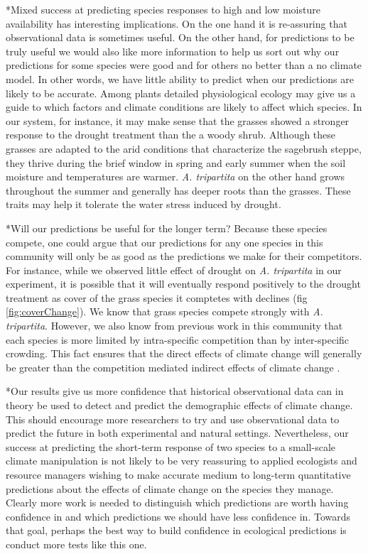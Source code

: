 \documentclass[11pt]{article}
\begin{document}
\begin{doublespacing}
*Mixed success at predicting species responses to high and low moisture availability has interesting implications.  On the one hand it is re-assuring that observational data is sometimes useful. On the other hand, for predictions to be truly useful we would also like more information to help us sort out why our predictions for some species were good and for others no better than a no climate model.  In other words, we have little ability to predict when our predictions are likely to be accurate.  Among plants detailed physiological ecology may give us a guide to which factors and climate conditions are likely to affect which species.  In our system, for instance, it may make sense that the grasses showed a stronger response to the drought treatment than the a woody shrub.  Although these grasses are adapted to the arid conditions that characterize the sagebrush steppe, they thrive during the brief window in spring and early summer when the soil moisture and temperatures are warmer.  \textit{A. tripartita} on the other hand grows throughout the summer and generally has deeper roots than the grasses. These traits may help it tolerate the water stress induced by drought. 

*Will our predictions be useful for the longer term? Because these species compete, one could argue that our predictions for any one species in this community will only be as good as the predictions we make for their competitors. For instance, while we observed little effect of drought on \textit{A. tripartita} in our experiment, it is possible that it will eventually respond positively to the drought treatment as cover of the grass species it comptetes with declines (fig \ref{fig:coverChange}). We know that grass species compete strongly with \textit{A. tripartita}.  However, we also know from previous work in this community that each species is more limited by intra-specific competition than by inter-specific crowding.  This fact ensures that the direct effects of climate change will generally be greater than the competition mediated indirect effects of climate change \cite{chu_direct_2016, kleinhesselink_indirect_2015}.  

*Our results give us more confidence that historical observational data can in theory be used to detect and predict the demographic effects of climate change. This should encourage more researchers to try and use observational data to predict the future in both experimental and natural settings. Nevertheless, our success at predicting the short-term response of two species to a small-scale climate manipulation is not likely to be very reassuring to applied ecologists and resource managers wishing to make accurate medium to long-term quantitative predictions about the effects of climate change on the species they manage.  Clearly more work is needed to distinguish which predictions are worth having confidence in and which predictions we should have less confidence in. Towards that goal, perhaps the best way to build confidence in ecological predictions is conduct more tests like this one.   
  

\end{doublespacing}
\end{document}
